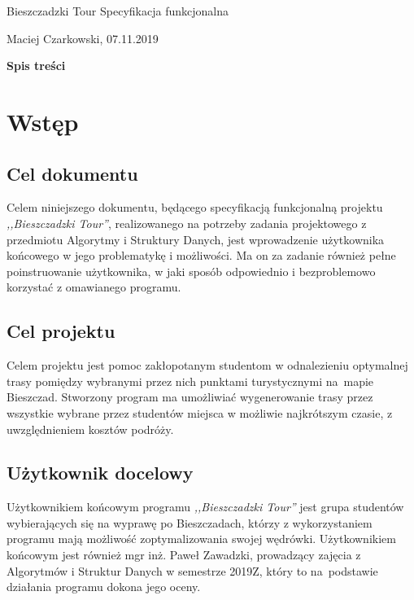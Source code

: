 \documentclass[12pt,a4paper]{article}
\begin{document}
\begin{titlepage}
\vspace*{\fill}
\begin{center}
{\fontsize{50}{0.1}\selectfont Bieszczadzki Tour}
\huge Specyfikacja funkcjonalna
\end{center}
\vspace*{\fill}
\begin{center}
Maciej Czarkowski, 07.11.2019
\end{center}
\end{titlepage}
\clearpage
\hspace{1cm}
\begin{center}
\LARGE\textbf{Spis treści}
\end{center}
\tableofcontents
\clearpage
\section{Wstęp}
\subsection{Cel dokumentu}
Celem niniejszego dokumentu, będącego specyfikacją funkcjonalną projektu \textsl{,,Bieszczadzki Tour''}, realizowanego na potrzeby zadania projektowego z przedmiotu Algorytmy i Struktury Danych, jest wprowadzenie użytkownika końcowego w jego problematykę i możliwości. Ma on za zadanie również pełne poinstruowanie użytkownika, w jaki sposób odpowiednio i bezproblemowo korzystać z omawianego programu.
\subsection{Cel projektu}
Celem projektu jest pomoc zakłopotanym studentom w odnalezieniu optymalnej trasy pomiędzy wybranymi przez nich punktami turystycznymi na~mapie Bieszczad. Stworzony program ma umożliwiać wygenerowanie trasy przez wszystkie wybrane przez studentów miejsca w możliwie najkrótszym czasie, z uwzględnieniem kosztów podróży.
\subsection{Użytkownik docelowy}
Użytkownikiem końcowym programu \textsl{,,Bieszczadzki Tour''} jest grupa studentów wybierających się na wyprawę po Bieszczadach, którzy z wykorzystaniem programu mają możliwość zoptymalizowania swojej wędrówki. Użytkownikiem końcowym jest również mgr inż. Paweł Zawadzki, prowadzący zajęcia z Algorytmów i Struktur Danych w semestrze 2019Z, który to na~podstawie działania programu dokona jego oceny.
\newpage
\end{document}
